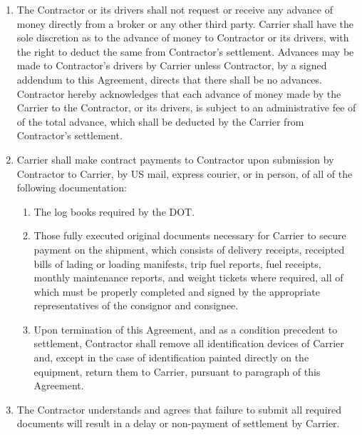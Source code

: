 \begin{enumerate}[ 
    ref = \SecondLevelEnumerator
]
    \item The Contractor or its drivers shall not request or receive any
    advance of money directly from a broker or any other third party.
    Carrier shall have the sole discretion as to the advance of money to
    Contractor or its drivers, with the right to deduct the same from
    Contractor's settlement. Advances may be made to Contractor's drivers
    by Carrier unless Contractor, by a signed addendum to this Agreement,
    directs that there shall be no advances. Contractor hereby acknowledges
    that each advance of money made by the Carrier to the Contractor, or
    its drivers, is subject to an administrative fee of
    {\bfseries \CashAdvanceServiceFee} of the total advance, which shall be
    deducted by the Carrier from Contractor's settlement.

    \item Carrier shall make contract payments to Contractor upon
    submission by Contractor to Carrier, by US mail, express courier, or in
    person, of all of the following documentation:
    \begin{enumerate}[
        ref = \ThirdLevelEnumerator
    ]
        \item The log books required by the DOT.
        
        \item Those fully executed original documents necessary for Carrier
        to secure payment on the shipment, which consists of delivery
        receipts, receipted bills of lading or loading manifests, trip fuel
        reports, fuel receipts, monthly maintenance reports, and weight
        tickets where required, all of which must be properly completed and
        signed by the appropriate representatives of the consignor and
        consignee.
        
        \item Upon termination of this Agreement, and as a condition
        precedent to settlement, Contractor shall remove all identification
        devices of Carrier and, except in the case of identification
        painted directly on the equipment, return them to Carrier, pursuant
        to paragraph
        of this Agreement.
    \end{enumerate}

    \item The Contractor understands and agrees that failure to submit all
    required documents will result in a delay or non-payment of settlement
    by Carrier.


\end{enumerate}
